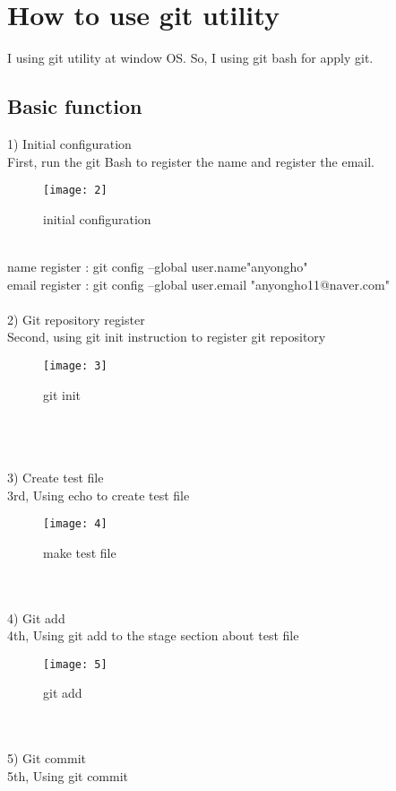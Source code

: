 \chapter{How to use git utility}\label{ch:conclusion}
I using git utility at window OS. So, I using git bash for apply git.

\section{Basic function}
1) Initial configuration\\
First, run the git Bash to register the name and register the email.
\begin{figure} [!h]
	\centering
	\texttt{[image: 2]}
	\caption{initial configuration}
	\label{fig:2}
\end{figure}\\
name register : git config --global user.name"anyongho"\\
email register : git config --global user.email "anyongho11@naver.com"\\
\\
2) Git repository register\\
Second, using git init instruction to register git repository\\
\begin{figure} [!h]
	\centering
	\texttt{[image: 3]}
	\caption{git init}
	\label{fig:3}
\end{figure}\\
\\\\
3) Create test file\\
3rd, Using echo to create test file\\
\begin{figure} [!h]
	\centering
	\texttt{[image: 4]}
	\caption{make test file}
	\label{fig:4}
\end{figure}\\
\\
4) Git add\\
4th, Using git add to the stage section about test file\\
\begin{figure} [!h]
	\centering
	\texttt{[image: 5]}
	\caption{git add}
	\label{fig:5}
\end{figure}\\
\\
5) Git commit\\
5th, Using git commit\\
